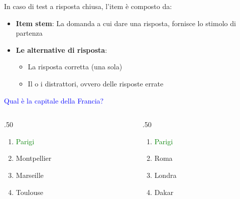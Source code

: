 \documentclass[compress]{beamer}
\begin{document}
\begin{frame}
	
	
	In caso di test a risposta chiusa, l'item è composto da: 
	
	\begin{itemize}
		\item \textbf{Item stem}: La domanda a cui dare una risposta, fornisce lo stimolo di partenza
		\item \textbf{Le alternative di risposta}: 
		\begin{itemize}
			\item La risposta corretta (una sola)
			\item Il o i distrattori, ovvero delle risposte errate
		\end{itemize}
	\end{itemize}
	
\small
	\bigskip
	\pause
	
			\textcolor{blue}{Qual è la capitale della Francia? }
	

	\begin{columns}[T]
		\begin{column}{.50\linewidth}
			\begin{enumerate}
				\item \textcolor{green}{Parigi}
				\item \textcolor{unipd}{Montpellier}
				\item \textcolor{unipd}{Marseille}
				\item \textcolor{unipd}{Toulouse}
			\end{enumerate}
			
		\end{column}

		\begin{column}{.50\linewidth}
			\begin{enumerate}
				\item \textcolor{green}{Parigi}
				\item \textcolor{unipd}{Roma}
				\item \textcolor{unipd}{Londra}
				\item \textcolor{unipd}{Dakar}
			\end{enumerate}
			
		\end{column}
	\end{columns}
\end{frame}
\end{document}
